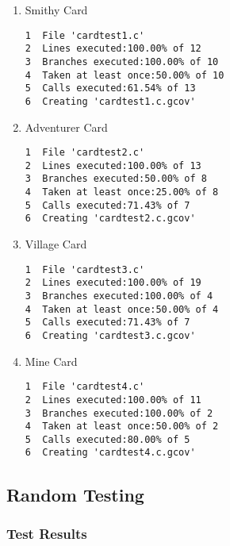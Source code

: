 \documentclass[11pt]{article}
\begin{document}
\begin{enumerate}
\item Smithy Card
\label{sec:smithycard1}
\begin{verbatim}
1  File 'cardtest1.c'
2  Lines executed:100.00% of 12
3  Branches executed:100.00% of 10
4  Taken at least once:50.00% of 10
5  Calls executed:61.54% of 13
6  Creating 'cardtest1.c.gcov'
\end{verbatim}

\item Adventurer Card
\label{sec:adventurercard1}
\begin{verbatim}
1  File 'cardtest2.c'
2  Lines executed:100.00% of 13
3  Branches executed:50.00% of 8
4  Taken at least once:25.00% of 8
5  Calls executed:71.43% of 7
6  Creating 'cardtest2.c.gcov'
\end{verbatim}

\item Village Card
\label{sec:villagecard1}
\begin{verbatim}
1  File 'cardtest3.c'
2  Lines executed:100.00% of 19
3  Branches executed:100.00% of 4
4  Taken at least once:50.00% of 4
5  Calls executed:71.43% of 7
6  Creating 'cardtest3.c.gcov'
\end{verbatim}

\item Mine Card
\label{sec:minecard1}
\begin{verbatim}
1  File 'cardtest4.c'
2  Lines executed:100.00% of 11
3  Branches executed:100.00% of 2
4  Taken at least once:50.00% of 2
5  Calls executed:80.00% of 5
6  Creating 'cardtest4.c.gcov'
\end{verbatim}
\end{enumerate}

\subsection{Random Testing}
\label{sec:randomtesting}

\subsubsection{Test Results}
\label{sec:testresults1}
\end{document}
